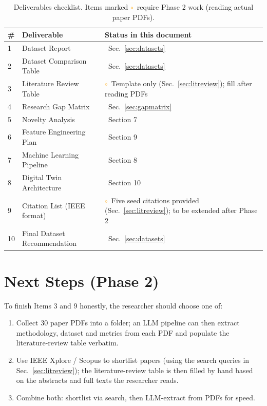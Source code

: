 \documentclass[11pt,a4paper]{article}
\newcommand{\yes}{\textcolor{checkgreen}{\checkmark}}
\newcommand{\partialmark}{\textcolor{orange}{$\circ$}}
\begin{document}
\begin{table}[H]
\centering
\small
\begin{tabular}{p{0.8cm}p{8.0cm}p{4.6cm}}
\toprule
\textbf{\#} & \textbf{Deliverable} & \textbf{Status in this document} \\
\midrule
1  & Dataset Report                    & \yes\ Sec.~\ref{sec:datasets} \\
2  & Dataset Comparison Table          & \yes\ Sec.~\ref{sec:datasets} \\
3  & Literature Review Table           & \partialmark\ Template only (Sec.~\ref{sec:litreview}); fill after reading PDFs \\
4  & Research Gap Matrix               & \yes\ Sec.~\ref{sec:gapmatrix} \\
5  & Novelty Analysis                  & \yes\ Section 7 \\
6  & Feature Engineering Plan          & \yes\ Section 9 \\
7  & Machine Learning Pipeline         & \yes\ Section 8 \\
8  & Digital Twin Architecture         & \yes\ Section 10 \\
9  & Citation List (IEEE format)       & \partialmark\ Five seed citations provided (Sec.~\ref{sec:litreview}); to be extended after Phase 2 \\
10 & Final Dataset Recommendation      & \yes\ Sec.~\ref{sec:datasets} \\
\bottomrule
\end{tabular}
\caption{Deliverables checklist. Items marked \partialmark\ require
Phase 2 work (reading actual paper PDFs).}
\end{table}

\section{Next Steps (Phase 2)}

To finish Items 3 and 9 honestly, the researcher should choose one of:

\begin{enumerate}[leftmargin=1.6em]
    \item Collect 30 paper PDFs into a folder; an LLM pipeline can then
        extract methodology, dataset and metrics from each PDF and
        populate the literature-review table verbatim.
    \item Use IEEE Xplore / Scopus to shortlist papers (using the search
        queries in Sec.~\ref{sec:litreview}); the literature-review
        table is then filled by hand based on the abstracts and full
        texts the researcher reads.
    \item Combine both: shortlist via search, then LLM-extract from PDFs
        for speed.
\end{enumerate}
\end{document}
